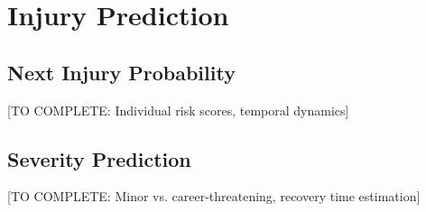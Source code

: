 \section{Injury Prediction}

\subsection{Next Injury Probability}

[TO COMPLETE: Individual risk scores, temporal dynamics]

\subsection{Severity Prediction}

[TO COMPLETE: Minor vs. career-threatening, recovery time estimation]